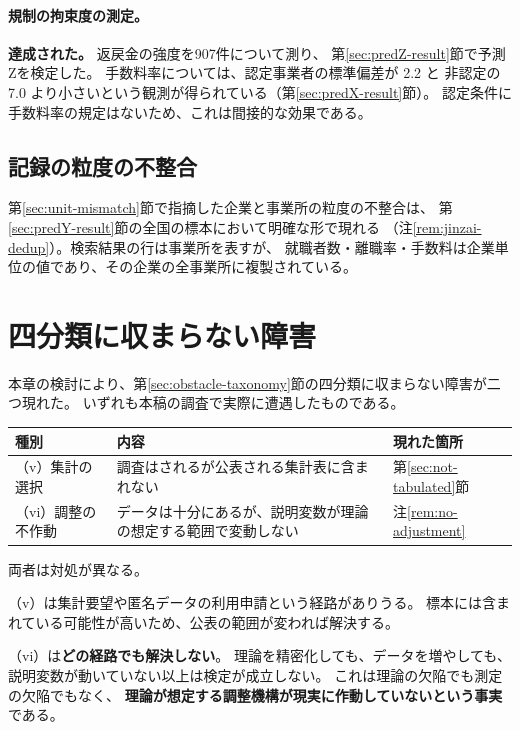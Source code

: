\paragraph{規制の拘束度の測定。}
\textbf{達成された。} 返戻金の強度を907件について測り、
第\ref{sec:predZ-result}節で予測Zを検定した。
手数料率については、認定事業者の標準偏差が 2.2 と
非認定の 7.0 より小さいという観測が得られている（第\ref{sec:predX-result}節）。
認定条件に手数料率の規定はないため、これは間接的な効果である。

\subsection{記録の粒度の不整合}

第\ref{sec:unit-mismatch}節で指摘した企業と事業所の粒度の不整合は、
第\ref{sec:predY-result}節の全国の標本において明確な形で現れる
（注\ref{rem:jinzai-dedup}）。検索結果の行は事業所を表すが、
就職者数・離職率・手数料は企業単位の値であり、その企業の全事業所に複製されている。

\section{四分類に収まらない障害}
\label{sec:sixth-obstacle}

本章の検討により、第\ref{sec:obstacle-taxonomy}節の四分類に収まらない障害が二つ現れた。
いずれも本稿の調査で実際に遭遇したものである。

\begin{center}
\begin{tabularx}{\textwidth}{@{}lXl@{}}
\toprule
種別 & 内容 & 現れた箇所 \\
\midrule
（v）集計の選択 & 調査はされるが公表される集計表に含まれない & 第\ref{sec:not-tabulated}節 \\
（vi）調整の不作動 & データは十分にあるが、説明変数が理論の想定する範囲で変動しない & 注\ref{rem:no-adjustment} \\
\bottomrule
\end{tabularx}
\label{tab:sixth-obstacle-summary}
\end{center}

両者は対処が異なる。

（v）は集計要望や匿名データの利用申請という経路がありうる。
標本には含まれている可能性が高いため、公表の範囲が変われば解決する。

（vi）は\textbf{どの経路でも解決しない}。
理論を精密化しても、データを増やしても、
説明変数が動いていない以上は検定が成立しない。
これは理論の欠陥でも測定の欠陥でもなく、
\textbf{理論が想定する調整機構が現実に作動していないという事実}である。

